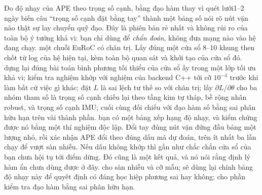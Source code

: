 \documentclass[../../deep_learning.tex]{subfiles}
\begin{document}
\begin{duan}{Đo độ nhạy của APE theo trọng số cạnh, bằng đạo hàm thay vì quét lưới}{1--2 ngày}
\dmt biến câu ``trọng số cạnh đặt bằng tay'' thành một bảng số nói rõ nút vặn nào thật sự lay chuyển quỹ đạo. Đây là phiên bản rẻ nhất và không rủi ro của toàn bộ ý tưởng khả vi: bạn chỉ dùng  để \emph{chẩn đoán}, không đưa mạng nào vào hệ đang chạy.
\ddl một chuỗi EuRoC có chân trị. Lấy đúng một cửa sổ 8--10 khung then chốt từ log của hệ hiện tại, kèm toàn bộ quan sát và khởi tạo của cửa sổ đó.
\dbc dựng lại đúng bài toán bình phương tối thiểu của cửa sổ ấy trong một lớp tối ưu khả vi; kiểm tra nghiệm khớp với nghiệm của backend C++ tới cỡ \(10^{-4}\) trước khi làm bất cứ việc gì khác; đặt \(L\) là sai lệch tư thế so với chân trị; lấy \(\partial L/\partial\theta\) cho ba nhóm tham số là trọng số cạnh chiếu lại theo tầng kim tự tháp, bề rộng nhân robust, và trọng số cạnh IMU; cuối cùng đối chiếu với đạo hàm số bằng sai phân hữu hạn trên vài thành phần.
\dxk bạn có một bảng xếp hạng độ nhạy, và kiểm chứng được nó bằng một thí nghiệm độc lập. Đổi tay đúng nút vặn đứng đầu bảng một lượng nhỏ, rồi xác nhận APE đổi theo đúng dấu mà  dự đoán, trên ít nhất ba lần chạy để vượt sàn nhiễu. Nếu dấu không khớp thì gần như chắc chắn cửa sổ của bạn chưa hội tụ tới điểm dừng. Đó cũng là một kết quả, và nó nói rằng định lý hàm ẩn chưa dùng được ở đây.
\dnv {} cho sàn nhiễu và cỡ mẫu;  sẽ dùng lại chính bảng độ nhạy này để quyết định có đáng học hiệp phương sai hay không;  cho phần kiểm tra đạo hàm bằng sai phân hữu hạn.
\end{duan}
\end{document}
